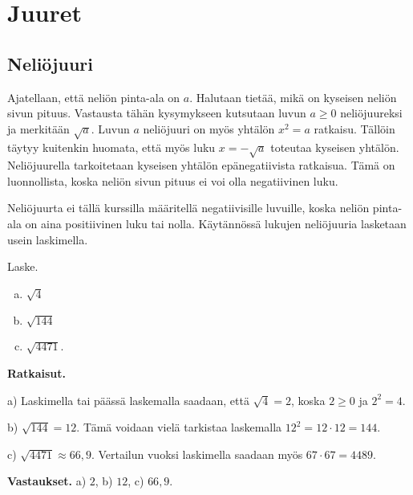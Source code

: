 \chapter{Juuret}

\section{Neliöjuuri}

Ajatellaan, että neliön pinta-ala on $a$. Halutaan tietää, mikä on kyseisen neliön sivun pituus. Vastausta tähän kysymykseen kutsutaan luvun $a\ge 0$ neliöjuureksi ja merkitään $\sqrt{a}$. Luvun $a$ neliöjuuri on myös yhtälön $x^2 = a$ ratkaisu. Tällöin täytyy kuitenkin huomata, että myös luku $x=-\sqrt{a}$ toteutaa kyseisen yhtälön. Neliöjuurella tarkoitetaan kyseisen yhtälön epänegatiivista ratkaisua. Tämä on luonnollista, koska neliön sivun pituus ei voi olla negatiivinen luku.


Neliöjuurta ei tällä kurssilla määritellä negatiivisille luvuille, koska neliön pinta-ala on aina positiivinen luku tai nolla. Käytännössä lukujen neliöjuuria lasketaan usein laskimella.


\begin{esimerkki}
Laske.
\begin{enumerate}[a)]
\item $\sqrt{4}$

\item $\sqrt{144}$

\item $\sqrt{4471}$.
\end{enumerate}

{\bf Ratkaisut.}

a)
Laskimella tai päässä laskemalla saadaan, että $\sqrt{4} = 2$, koska $2\geq0$ ja $2^2 =4$.

b) 
$\sqrt{144}=12$. Tämä voidaan vielä tarkistaa laskemalla $12^2 = 12\cdot 12=144$.

c)
$\sqrt{4471}\approx 66,9$. Vertailun vuoksi laskimella saadaan myös $67\cdot 67=4489$.

{\bf Vastaukset.}
a) $2$, b) $12$, c) $66,9$.

\end{esimerkki}


